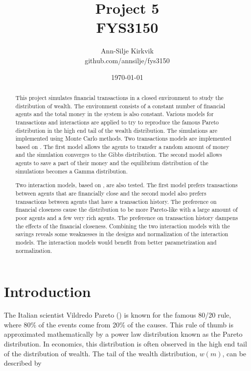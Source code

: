 \documentclass{article}
\begin{document}
\title{\vspace{1cm}Project 5 \\ FYS3150}

\author{\vspace{1cm}Ann-Silje Kirkvik \\ github.com/annsilje/fys3150}
\date{\vspace{5cm}\today}

\maketitle

\newpage

\begin{abstract}
This project simulates financial transactions in a closed environment to study the distribution of wealth. The environment consists of a constant number of financial agents and the total money in the system is also constant. Various models for transactions and interactions are applied to try to reproduce the famous Pareto distribution in the high end tail of the wealth distribution. The simulations are implemented using Monte Carlo methods. Two transactions models are implemented based on \cite{gibbs}. The first model allows the agents to transfer a random amount of money and the simulation converges to the Gibbs distribution. The second model allows agents to save a part of their money and the equilibrium distribution of the simulations becomes a Gamma distribution.

Two interaction models, based on \cite{interaction}, are also tested. The first model prefers transactions between agents that are financially close and the second model also prefers transactions between agents that have a transaction history. The preference on financial closeness cause the distribution to be more Pareto-like with a large amount of poor agents and a few very rich agents. The preference on transaction history dampens the effects of the financial closeness. Combining the two interaction models with the savings reveals some weaknesses in the designs and normalization of the interaction models. The interaction models would benefit from better parametrization and normalization.
\end{abstract}

\vspace{1cm}


\section{Introduction}
The Italian scientist Vildredo Pareto (\cite{pareto}) is known for the famous 80/20 rule, where 80\% of the events come from 20\% of the causes. This rule of thumb is approximated mathematically by a power law distribution known as the Pareto distribution. In economics, this distribution is often observed in the high end tail of the distribution of wealth. The tail of the wealth distribution, $w(m)$, can be described by
\end{document}

